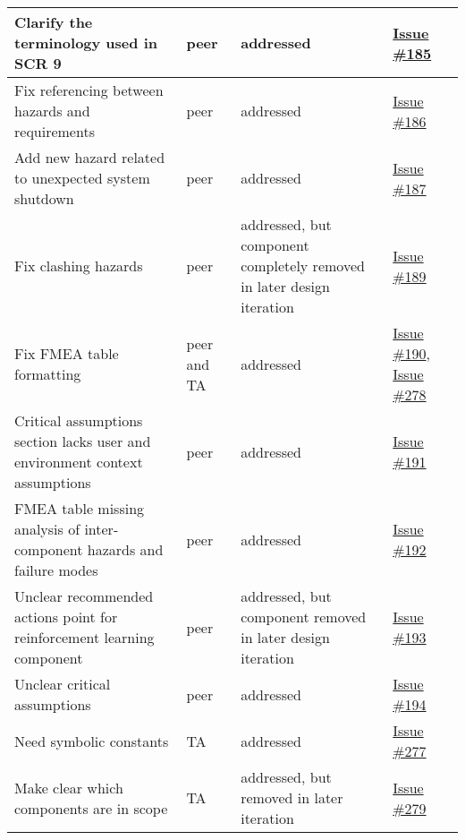 \documentclass{article}
\begin{document}
\begin{longtable}[H]{|p{5cm}|p{2cm}|p{5cm}|p{3cm}|}
    Clarify the terminology used in SCR 9 & peer & addressed & \href{https://github.com/ssm-lab/capstone--source-code-optimizer/issues/185}{Issue \#185} \\ \hline
    Fix referencing between hazards and requirements & peer & addressed & \href{https://github.com/ssm-lab/capstone--source-code-optimizer/issues/186}{Issue \#186} \\ \hline
    Add new hazard related to unexpected system shutdown & peer & addressed & \href{https://github.com/ssm-lab/capstone--source-code-optimizer/issues/187}{Issue \#187} \\ \hline
    Fix clashing hazards & peer & addressed, but component completely removed in later design iteration  & \href{https://github.com/ssm-lab/capstone--source-code-optimizer/issues/189}{Issue \#189} \\ \hline
    Fix FMEA table formatting & peer and TA & addressed & \href{https://github.com/ssm-lab/capstone--source-code-optimizer/issues/190}{Issue \#190}, \href{https://github.com/ssm-lab/capstone--source-code-optimizer/issues/278}{Issue \#278} \\
    \hline
    Critical assumptions section lacks user and environment context assumptions & peer & addressed & \href{https://github.com/ssm-lab/capstone--source-code-optimizer/issues/191}{Issue \#191} \\ \hline
    FMEA table missing analysis of inter-component hazards and failure modes & peer & addressed & \href{https://github.com/ssm-lab/capstone--source-code-optimizer/issues/192}{Issue \#192} \\ \hline
    Unclear recommended actions point for reinforcement learning component & peer & addressed, but component removed in later design iteration & \href{https://github.com/ssm-lab/capstone--source-code-optimizer/issues/193}{Issue \#193} \\ \hline
    Unclear critical assumptions & peer & addressed & \href{https://github.com/ssm-lab/capstone--source-code-optimizer/issues/194}{Issue \#194} \\ \hline
    Need symbolic constants & TA & addressed & \href{https://github.com/ssm-lab/capstone--source-code-optimizer/issues/277}{Issue \#277} \\\hline
    Make clear which components are in scope & TA & addressed, but removed in later iteration & \href{https://github.com/ssm-lab/capstone--source-code-optimizer/issues/279}{Issue \#279} \\\hline
\end{longtable}
\end{document}
